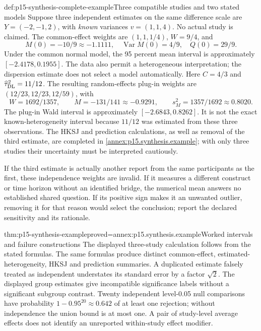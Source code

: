 \begin{hbexample}{def:p15-synthesis-complete-example}{Three compatible studies and two stated models}
Suppose three independent estimates on the same difference scale are
\(Y=(-2,-1,2)\), with \emph{known} variances \(v=(1,1,4)\).
No actual study is claimed. The common-effect weights are
\((1,1,1/4)\), \(W=9/4\), and
\[
 M(0)=-10/9\approx-1.1111,\quad
 \operatorname{Var}M(0)=4/9,\quad Q(0)=29/9.
\]
Under the common normal model, the 95 percent mean interval is approximately
\([-2.4178,0.1955]\). The data also permit a heterogeneous interpretation;
the dispersion estimate does not select a model automatically.
Here \(C=4/3\) and \(\widehat\tau_{\rm DL}^2=11/12\).
The resulting random-effects plug-in weights are
\((12/23,12/23,12/59)\), with
\[
 W=1692/1357,\qquad M=-131/141\approx-0.9291,
 \qquad s_M^2=1357/1692\approx0.8020.
\]
The plug-in Wald interval is approximately \([-2.6843,0.8262]\).
It is not the exact known-heterogeneity interval because \(11/12\) was
estimated from these three observations. The HKSJ and prediction calculations,
as well as removal of the third estimate, are completed in
\ref{annex:p15.synthesis.example}; with only three studies their uncertainty
must be interpreted cautiously.

If the third estimate is actually another report from the same participants
as the first, these independence weights are invalid. If it measures a different
construct or time horizon without an identified bridge, the numerical mean
answers no established shared question. If its positive sign makes it an
unwanted outlier, removing it for that reason would select the conclusion;
report the declared sensitivity and its rationale.
\end{hbexample}

\begin{hbtheorem}{thm:p15-synthesis-example}{proved=annex:p15.synthesis.example}{Worked intervals and failure constructions}
The displayed three-study calculation follows from the stated formulas.
The same formulas produce distinct common-effect, estimated-heterogeneity,
HKSJ and prediction summaries. A duplicated estimate falsely treated as
independent understates its standard error by a factor \(\sqrt2\).
The displayed group estimates give incompatible significance labels without
a significant subgroup contrast. Twenty independent level-0.05 null comparisons
have probability \(1-0.95^{20}\approx0.642\) of at least one rejection;
without independence the union bound is at most one. A pair of study-level
average effects does not identify an unreported within-study effect modifier.
\end{hbtheorem}

